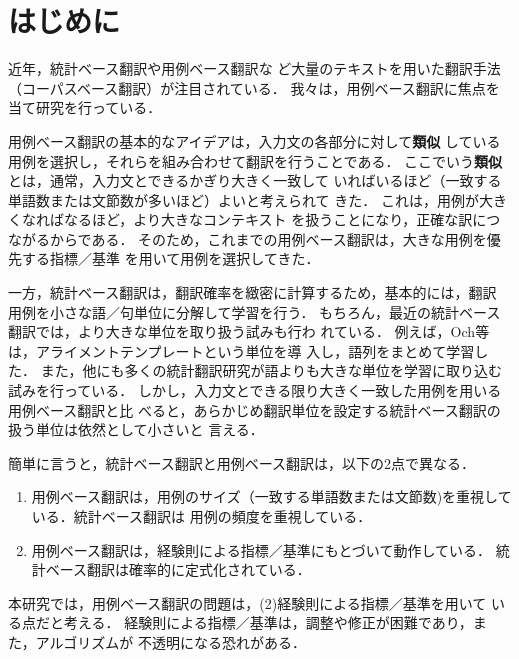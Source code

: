\maketitle
\thispagestyle{empty}

\section{はじめに}
近年，統計ベース翻訳\cite{Brown1993}や用例ベース翻訳\cite{Nagao1984}な
ど大量のテキストを用いた翻訳手法（コーパスベース翻訳）が注目されている．
我々は，用例ベース翻訳に焦点を当て研究を行っている．

用例ベース翻訳の基本的なアイデアは，入力文の各部分に対して\textbf{類似}
している用例を選択し，それらを組み合わせて翻訳を行うことである．
ここでいう\textbf{類似}とは，通常，入力文とできるかぎり大きく一致して
いればいるほど（一致する単語数または文節数が多いほど）よいと考えられて
きた．
これは，用例が大きくなればなるほど，より大きなコンテキスト
を扱うことになり，正確な訳につながるからである．
そのため，これまでの用例ベース翻訳は，大きな用例を優先する指標／基準
を用いて用例を選択してきた．

一方，統計ベース翻訳は，翻訳確率を緻密に計算するため，基本的には，翻訳
用例を小さな語／句単位に分解して学習を行う．
もちろん，最近の統計ベース翻訳では，より大きな単位を取り扱う試みも行わ
れている．
例えば，Och\cite{Och1999}等は，アライメントテンプレートという単位を導
入し，語列をまとめて学習した．
また，他にも多くの統計翻訳研究が語よりも大きな単位を学習に取り込む試みを行っている\cite{Koehn2003,Watanabe2003}．
しかし，入力文とできる限り大きく一致した用例を用いる用例ベース翻訳と比
べると，あらかじめ翻訳単位を設定する統計ベース翻訳の扱う単位は依然として小さいと
言える．

簡単に言うと，統計ベース翻訳と用例ベース翻訳は，以下の2点で異なる．

\begin{enumerate}
\item 用例ベース翻訳は，用例のサイズ（一致する単語数または文節数)を重視している．統計ベース翻訳は
      用例の頻度を重視している．
\item 用例ベース翻訳は，経験則による指標／基準にもとづいて動作している．
      統計ベース翻訳は確率的に定式化されている．
\end{enumerate}

本研究では，用例ベース翻訳の問題は，(2)経験則による指標／基準を用いて
いる点だと考える．
経験則による指標／基準は，調整や修正が困難であり，また，アルゴリズムが
不透明になる恐れがある．


